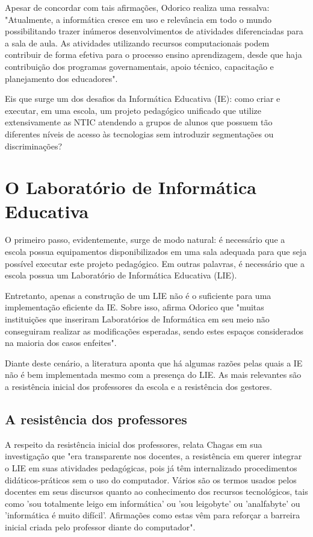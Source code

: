 Apesar de concordar com tais afirmações, Odorico \cite{art:REF_ART_ODORICO} realiza uma ressalva: "Atualmente, a informática cresce em uso e relevância em todo o mundo possibilitando trazer inúmeros desenvolvimentos de atividades diferenciadas para a sala de aula. As atividades utilizando recursos computacionais podem contribuir de forma efetiva para o processo ensino aprendizagem, desde que haja contribuição dos programas governamentais, apoio técnico, capacitação e planejamento dos educadores".

Eis que surge um dos desafios da Informática Educativa (IE): como criar e executar, em uma escola, um projeto pedagógico unificado que utilize extensivamente as NTIC atendendo a grupos de alunos que possuem tão diferentes níveis de acesso às tecnologias sem introduzir segmentações ou discriminações?

\section{O Laboratório de Informática Educativa}\label{sec:LABEL_CHP_REF_TEO_SEC_LIE}

O primeiro passo, evidentemente, surge de modo natural: é necessário que a escola possua equipamentos disponibilizados em uma sala adequada para que seja possível executar este projeto pedagógico. Em outras palavras, é necessário que a escola possua um Laboratório de Informática Educativa (LIE).

Entretanto, apenas a construção de um LIE não é o suficiente para uma implementação eficiente da IE. Sobre isso, afirma Odorico \cite{art:REF_ART_ODORICO} que "muitas instituições que inseriram Laboratórios de Informática em seu meio não conseguiram realizar as modificações esperadas, sendo estes espaços considerados na maioria dos casos enfeites".

Diante deste cenário, a literatura aponta que há algumas razões pelas quais a IE não é bem implementada mesmo com a presença do LIE. As mais relevantes são a resistência inicial dos professores da escola e a resistência dos gestores.

\subsection{A resistência dos professores}\label{sec:LABEL_CHP_REF_TEO_SEC_RES_PROF}

A respeito da resistência inicial dos professores, relata Chagas \cite{art:REF_ART_CHAGAS} em sua investigação que "era transparente nos docentes, a resistência em querer integrar o LIE em suas atividades pedagógicas, pois já têm internalizado procedimentos didáticos-práticos sem o uso do computador. Vários são os termos usados pelos docentes em seus discursos quanto ao conhecimento dos recursos tecnológicos, tais como 'sou totalmente leigo em informática' ou 'sou leigobyte' ou 'analfabyte' ou 'informática é muito difícil'. Afirmações como estas vêm para reforçar a barreira inicial criada pelo professor diante do computador".

